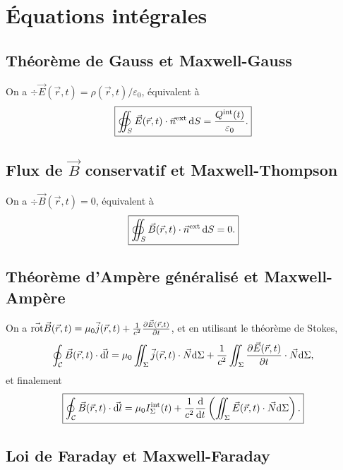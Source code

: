\section{Équations intégrales}
\subsection{Théorème de Gauss et Maxwell-Gauss}

On a $\div\vec{E}(\vec{r},t)=\rho(\vec{r},t)/\varepsilon_0$, équivalent à 
\begin{equation}
    \boxed{
        \oiint_{S}\vec{E}(\vec{r},t)\cdot\vec{n}^{\mathrm{ext}}\,\mathrm{d} S=\frac{Q^{\mathrm{int}}(t)}{\varepsilon_0}.
    }
\end{equation}

\subsection{Flux de \texorpdfstring{$\vec{B}$}{B} conservatif et Maxwell-Thompson}

On a $\div\vec{B}(\vec{r},t)=0$, équivalent à
\begin{equation}
    \boxed{
        \oiint_{S}\vec{B}(\vec{r},t)\cdot\vec{n}^{\mathrm{ext}}\,\mathrm{d} S=0.
    }
\end{equation}

\subsection{Théorème d'Ampère généralisé et Maxwell-Ampère}

On a $\vec{\mathrm{rot}}\vec{B}(\vec{r},t)=\mu_0\vec{j}(\vec{r},t)+\frac{1}{c^{2}}\frac{\partial\vec{E}(\vec{r},t)}{\partial t}$, et en utilisant le théorème de Stokes,
\begin{equation}
    \oint_{\mathcal{C}}\vec{B}(\vec{r},t)\cdot\vec{\mathrm{d} l}=\mu_0\iint_{\Sigma}\vec{j}(\vec{r},t)\cdot\vec{N}\mathrm{d}\Sigma+\frac{1}{c^{2}}\iint_{\Sigma}\frac{\partial\vec{E}(\vec{r},t)}{\partial t}\cdot\vec{N}\mathrm{d}\Sigma,
\end{equation}
et finalement
\begin{equation}
    \boxed{
        \oint_{\mathcal{C}}\vec{B}(\vec{r},t)\cdot\vec{\mathrm{d} l}=\mu_{0}I_{\Sigma}^{\mathrm{int}}(t)+\frac{1}{c^{2}}\frac{\mathrm{d}}{\mathrm{d} t}\left(\iint_{\Sigma}\vec{E}(\vec{r},t)\cdot\vec{N}\mathrm{d}\Sigma\right).
    }
\end{equation}

\subsection{Loi de Faraday et Maxwell-Faraday}

